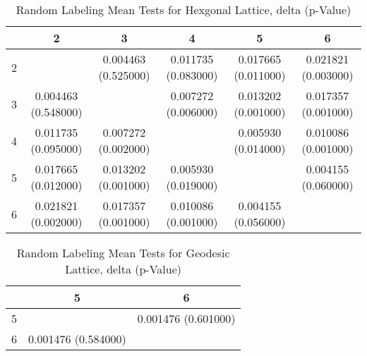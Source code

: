 \begin{table}
\centering
\caption{Random Labeling Mean Tests for Hexgonal Lattice,  delta (p-Value)}
\label{randomLabelTableHex}
\begin{tabular}{|c||c|c|c|c|c|}
\hline
&2&3&4&5&6\\
\hline
\hline
2& & 0.004463 (0.525000)& 0.011735 (0.083000)& 0.017665 (0.011000)& 0.021821
(0.003000)\\
\hline
3& 0.004463 (0.548000)& & 0.007272 (0.006000)& 0.013202 (0.001000)& 0.017357
(0.001000)\\
\hline
4& 0.011735 (0.095000)& 0.007272 (0.002000)& & 0.005930 (0.014000)& 0.010086
(0.001000)\\
\hline
5& 0.017665 (0.012000)& 0.013202 (0.001000)& 0.005930 (0.019000)& & 0.004155
(0.060000)\\
\hline
6& 0.021821 (0.002000)& 0.017357 (0.001000)& 0.010086 (0.001000)& 0.004155
(0.056000)& \\
\hline
\end{tabular} \end{table}

\begin{table}
\caption{Random Labeling Mean Tests for Geodesic Lattice,  delta (p-Value)}
\label{randomLabelTableGeodesic}
\begin{tabular}{|c||c|c|}
\hline
&5&6\\
\hline
\hline
5& & 0.001476 (0.601000)\\
\hline
6& 0.001476 (0.584000)& \\
\hline
\end{tabular} \end{table}





